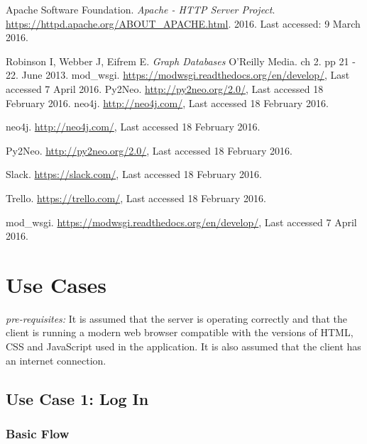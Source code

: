 \documentclass[12pt,onecolumn]{article}
\begin{document}
\begin{thebibliography}{1}
	 Apache Software Foundation. \emph{Apache - HTTP Server Project}. \url{https://httpd.apache.org/ABOUT_APACHE.html}. 2016. Last accessed: 9 March 2016.	
	
	 Robinson I, Webber J, Eifrem E. \emph{Graph Databases} O'Reilly Media. ch 2. pp 21 - 22. June 2013.
	 mod\_wsgi. \url{https://modwsgi.readthedocs.org/en/develop/}, Last accessed 7 April 2016.
	 Py2Neo. \url{http://py2neo.org/2.0/}, Last accessed 18 February 2016.
	 neo4j. \url{http://neo4j.com/}, Last accessed 18 February 2016.

	 neo4j. \url{http://neo4j.com/}, Last accessed 18 February 2016.

	 Py2Neo. \url{http://py2neo.org/2.0/}, Last accessed 18 February 2016.

	 Slack. \url{https://slack.com/}, Last accessed 18 February 2016.

	 Trello. \url{https://trello.com/}, Last accessed 18 February 2016.

	 mod\_wsgi. \url{https://modwsgi.readthedocs.org/en/develop/}, Last accessed 7 April 2016.


\end{thebibliography}

\newpage

\appendix

\section{Use Cases} \label{moreusecase}

\emph{pre-requisites:} It is assumed that the server is operating correctly and that the client is running a modern web browser compatible with the versions of HTML, CSS and JavaScript used in the application. It is also assumed that the client has an internet connection.

	\subsection{Use Case 1: Log In}

		\subsubsection{Basic Flow}
\end{document}
